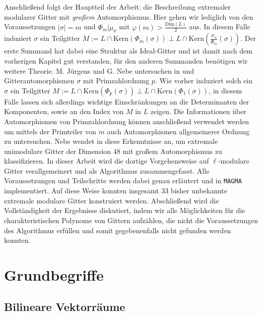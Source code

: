 \documentclass[12pt,a4paper,halfparskip,headsepline,bibtotocnumbered]{scrreprt}
\theoremstyle{nummermitklammern}
\theoremstyle{nonumberbreak}
\newcommand{\Kern}{\text{Kern}}
\begin{document}
Anschließend folgt der Hauptteil der Arbeit: die Beschreibung extremaler modularer Gitter mit \textit{großem} Automorphismus. Hier gehen wir lediglich von den Voraussetzungen $\vert \sigma \vert = m$ und $\Phi_m \vert \mu_\sigma$ mit $\varphi(m) > \frac{\text{Dim}(L)}{2}$ aus. In diesem Falle induziert $\sigma$ ein Teilgitter $M := L \cap \Kern(\Phi_m(\sigma)) \perp L \cap \Kern(\frac{\mu_\sigma}{\Phi_m}(\sigma))$. Der erste Summand hat dabei eine Struktur als Ideal-Gitter und ist damit nach dem vorherigen Kapitel gut verstanden, für den anderen Summanden benötigen wir weitere Theorie. M. Jürgens und G. Nebe untersuchen in \cite{juergens} und \cite{nebe} Gitterautomorphismen $\sigma$ mit Primzahlordnung $p$. Wie vorher induziert solch ein $\sigma$ ein Teilgitter $M := L \cap \Kern(\Phi_p(\sigma)) \perp L \cap \Kern(\Phi_1(\sigma))$, in diesem Falle lassen sich allerdings wichtige Einschränkungen an die Determinanten der Komponenten, sowie an den Index von $M$ in $L$ zeigen. Die Informationen über Automorphismen von Primzahlordnung können anschließend verwendet werden um mittels der Primteiler von $m$ auch Automorphismen allgemeinerer Ordnung zu untersuchen. Nebe wendet in \cite{nebe} diese Erkenntnisse an, um extremale unimodulare Gitter der Dimension $48$ mit großem Automorphismus zu klassifizieren. In dieser Arbeit wird die dortige Vorgehensweise auf $\ell$-modulare Gitter verallgemeinert und als Algorithmus zusammengefasst. Alle Voraussetzungen und Teilschritte werden dabei genau erläutert und in \texttt{MAGMA} implementiert. Auf diese Weise konnten insgesamt $33$ bisher unbekannte extremale modulare Gitter konstruiert werden. Abschließend wird die Vollständigkeit der Ergebnisse diskutiert, indem wir alle Möglichkeiten für die charakteristischen Polynome von Gittern aufzählen, die nicht die Voraussetzungen des Algorithmus erfüllen und somit gegebenenfalls nicht gefunden werden konnten.



\chapter{Grundbegriffe}

\section{Bilineare Vektorräume}
\end{document}

